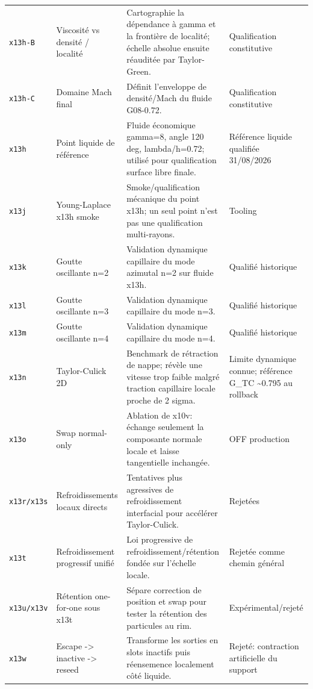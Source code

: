 \documentclass[a4paper,9pt]{article}
\begin{document}
\begin{landscape}
\begin{longtable}{L{2.35cm} L{5.3cm} L{13.25cm} L{4.75cm}}
\texttt{x13h-B} & Viscosité vs densité / localité & Cartographie la dépendance à gamma et la frontière de localité; échelle absolue ensuite réauditée par Taylor-Green. & Qualification constitutive \\
\texttt{x13h-C} & Domaine Mach final & Définit l'enveloppe de densité/Mach du fluide G08-0.72. & Qualification constitutive \\
\texttt{x13h} & Point liquide de référence & Fluide économique gamma=8, angle 120 deg, lambda/h=0.72; utilisé pour qualification surface libre finale. & Référence liquide qualifiée 31/08/2026 \\
\texttt{x13j} & Young-Laplace x13h smoke & Smoke/qualification mécanique du point x13h; un seul point n'est pas une qualification multi-rayons. & Tooling \\
\texttt{x13k} & Goutte oscillante n=2 & Validation dynamique capillaire du mode azimutal n=2 sur fluide x13h. & Qualifié historique \\
\texttt{x13l} & Goutte oscillante n=3 & Validation dynamique capillaire du mode n=3. & Qualifié historique \\
\texttt{x13m} & Goutte oscillante n=4 & Validation dynamique capillaire du mode n=4. & Qualifié historique \\
\texttt{x13n} & Taylor-Culick 2D & Benchmark de rétraction de nappe; révèle une vitesse trop faible malgré traction capillaire locale proche de 2 sigma. & Limite dynamique connue; référence G\_TC \textasciitilde{}0.795 au rollback \\
\texttt{x13o} & Swap normal-only & Ablation de x10v: échange seulement la composante normale locale et laisse tangentielle inchangée. & OFF production \\
\texttt{x13r/x13s} & Refroidissements locaux directs & Tentatives plus agressives de refroidissement interfacial pour accélérer Taylor-Culick. & Rejetées \\
\texttt{x13t} & Refroidissement progressif unifié & Loi progressive de refroidissement/rétention fondée sur l'échelle locale. & Rejetée comme chemin général \\
\texttt{x13u/x13v} & Rétention one-for-one sous x13t & Sépare correction de position et swap pour tester la rétention des particules au rim. & Expérimental/rejeté \\
\texttt{x13w} & Escape -> inactive -> reseed & Transforme les sorties en slots inactifs puis réensemence localement côté liquide. & Rejeté: contraction artificielle du support \\

\end{longtable}
\end{landscape}
\end{document}
